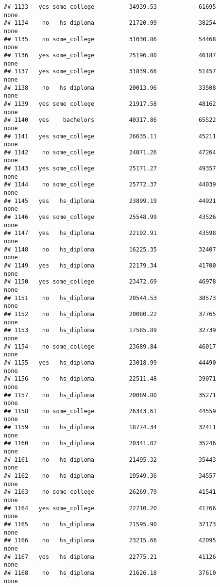 \documentclass[
]{article}
\begin{document}
\begin{verbatim}
## 1133   yes some_college          34939.53            61695        none
## 1134    no   hs_diploma          21720.99            38254        none
## 1135    no some_college          31030.86            54468        none
## 1136   yes some_college          25196.80            46187        none
## 1137   yes some_college          31839.66            51457        none
## 1138    no   hs_diploma          20013.96            33508        none
## 1139   yes some_college          21917.58            48162        none
## 1140   yes    bachelors          40317.86            65522        none
## 1141   yes some_college          26635.11            45211        none
## 1142    no some_college          24071.26            47264        none
## 1143   yes some_college          25171.27            49357        none
## 1144    no some_college          25772.37            44039        none
## 1145   yes   hs_diploma          23899.19            44921        none
## 1146   yes some_college          25548.99            43526        none
## 1147   yes   hs_diploma          22192.91            43598        none
## 1148    no   hs_diploma          16225.35            32407        none
## 1149   yes   hs_diploma          22179.34            41700        none
## 1150   yes some_college          23472.69            46978        none
## 1151    no   hs_diploma          20544.53            38573        none
## 1152    no   hs_diploma          20080.22            37765        none
## 1153    no   hs_diploma          17585.89            32739        none
## 1154    no some_college          23689.84            46017        none
## 1155   yes   hs_diploma          23018.99            44490        none
## 1156    no   hs_diploma          22511.48            39071        none
## 1157    no   hs_diploma          20089.80            35271        none
## 1158    no some_college          26343.61            44559        none
## 1159    no   hs_diploma          18774.34            32411        none
## 1160    no   hs_diploma          20341.02            35246        none
## 1161    no   hs_diploma          21495.32            35443        none
## 1162    no   hs_diploma          19549.36            34557        none
## 1163    no some_college          26269.79            41541        none
## 1164   yes some_college          22710.20            41766        none
## 1165    no   hs_diploma          21595.90            37173        none
## 1166    no   hs_diploma          23215.66            42095        none
## 1167   yes   hs_diploma          22775.21            41126        none
## 1168    no   hs_diploma          21626.18            37610        none

\end{verbatim}
\end{document}
